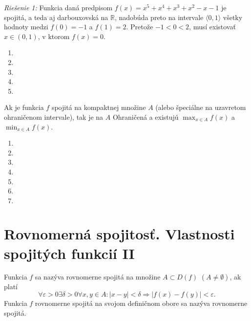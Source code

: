 \textit{Riešenie 1:}
Funkcia daná predpisom $f(x)=x^5+x^4+x^3+x^2-x-1$ je spojitá, a teda aj darbouxovská na $\mathbb{R}$, nadobúda preto na intervale $\langle 0,1 \rangle$ všetky hodnoty medzi $f(0)=-1$ a $f(1)=2$. Pretože $-1<0<2$, musí existovať $x \in (0,1)$, v ktorom $f(x)=0$.

\begin{enumerate}[resume]
  \item {}
  \item {}
  \item {}
  \item {}
  \item {}
\end{enumerate}

\begin{veta}
Ak je funkcia $f$ spojitá na kompaktnej množine $A$ (alebo špeciálne na uzavretom ohraničenom intervale), tak je na $A$ Ohraničená a existujú $\max_{x \in A}f(x)$ a $\min_{x \in A}f(x)$.
\end{veta}

\begin{enumerate}[resume]
  \item {}
  \item {}
  \item {}
  \item {}
  \item {}
  \item {}
  \item {}
\end{enumerate}

\section{Rovnomerná spojitosť. Vlastnosti spojitých funkcií II}
Funkcia $f$ sa nazýva rovnomerne spojitá na množine $A \subset D(f)$ $(A \neq \emptyset)$, ak platí
$$\forall \varepsilon > 0 \exists \delta > 0 \forall x,y\in A: |x-y|<\delta \Rightarrow |f(x)-f(y)|<\varepsilon.$$
Funkcia $f$ rovnomerne spojitá na svojom definičnom obore sa nazýva rovnomerne spojitá.

